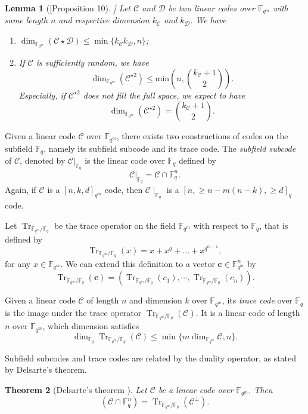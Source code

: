 \documentclass[a4paper]{article}
\newtheorem{thm}{Theorem}[section]
\newtheorem{lemma}[thm]{Lemma}
\theoremstyle{definition}
\theoremstyle{remark}
\newcommand{\calC}{\mathcal{C}}
\newcommand{\calD}{\mathcal{D}}
\newcommand{\fqm}{\mathbb{F}_{q^m}}
\newcommand{\fq}{\mathbb{F}_{q}}
\newcommand{\Tr}[1]{\operatorname{Tr}_{\mathbb{F}_{q^m}/\fq}\left(#1\right)}
\begin{document}
\begin{lemma}[\cite{MT21}[Proposition 10]] \label{lem:known_bounds}
Let $\calC$ and $\calD$ be two linear codes over $\fqm$ with same length $n$ and respective dimension $k_{\calC}$ and $k_{\calD}$. We have
\begin{enumerate}
	\item $\dim_{\fqm}(\calC \star \calD) \leq \min\{k_{\calC}k_{\calD},n\}$;
	\item If $\calC$ is sufficiently random, we have
\[ \dim_{\mathbb{F}_{q^m}}(\calC^{\star2}) \leq \mathrm{min}\left(n,\binom{k_{\calC}+1}{2}\right) . \]
Especially, if $\calC^{\star2}$ does not fill the full space, we expect to have 
	\[ \dim_{\fqm}(\calC^{\star2}) = \binom{k_{\calC}+1}{2}.\]
	\end{enumerate}
\end{lemma}

Given a linear code $\calC$ over $\fqm$, there exists two constructions of codes on the subfield $\fq$, namely its subfield subcode and its trace code. The \emph{subfield subcode} of $\calC$, denoted by $\calC|_{\fq}$ is the linear code over $\fq$ defined by 
\[\calC|_{\fq}=\calC \cap \mathbb{F}_q^n.\]
Again, if $\calC$ is a $[n,k,d]_{q^m}$ code, then $\calC\mid_{\fq}$ is a $[n,\geq n-m(n-k),\geq d]_q$ code.

Let $\operatorname{Tr}_{\mathbb{F}_{q^m}/\fq}$ be the trace operator on the field $\mathbb{F}_{q^m}$ with respect to $\mathbb{F}_q$, that is defined by
\[\Tr{x} = x + x^q + ... + x^{q^{m-1}},\]
for any $x \in \fqm$. We can extend this definition to a vector $\mathbf{c} \in \fqm^n$ by $$\Tr{\mathbf{c}}= (\Tr{c_1},\cdots,\Tr{c_n}).$$ 

\noindent Given a linear code $\calC$ of length $n$ and dimension $k$ over $\fqm$, its \emph{trace code} over $\fq$ is the image under the trace operator $\Tr{\calC}$. It is a linear code of length $n$ over $\fqm$, which dimension satisfies
\begin{equation}\label{eq:dim_trace}
\dim_{\mathbb{F}_q} \Tr{\calC} \leq \min\{m\dim_{\fqm} \calC,n\}.
\end{equation}

Subfield subcodes and trace codes are related by the duality operator, as stated by Delsarte's theorem.

\begin{thm}[Delsarte's theorem \cite{Del75}] \label{th:delsarte}
Let $\calC$ be a linear code over $\fqm$. Then
\[\left(\calC \cap \fq^n\right) = \Tr{\calC^{\perp}}.\]
\end{thm}
\end{document}
